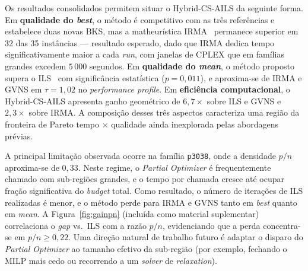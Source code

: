 Os resultados consolidados permitem situar o Hybrid-CS-AILS da seguinte
forma. Em \textbf{qualidade do \emph{best}}, o método é competitivo
com as três referências e estabelece duas novas BKS, mas a matheurística
IRMA~\cite{Stefanello2015} permanece superior em 32 das 35 instâncias
--- resultado esperado, dado que IRMA dedica tempo significativamente
maior a cada \emph{run}, com janelas de \textsc{CPLEX} que em famílias
grandes excedem $5\,000$ segundos. Em \textbf{qualidade do \emph{mean}},
o método proposto supera o ILS~\cite{Freitas2025} com significância
estatística ($p=0{,}011$), e aproxima-se de IRMA e GVNS em $\tau=1{,}02$
no \emph{performance profile}. Em \textbf{eficiência computacional}, o
Hybrid-CS-AILS apresenta ganho geométrico de $6{,}7\times$ sobre ILS e
GVNS e $2{,}3\times$ sobre IRMA. A composição desses três aspectos
caracteriza uma região da fronteira de Pareto
tempo $\times$ qualidade ainda inexplorada pelas abordagens prévias.

A principal limitação observada ocorre na família \texttt{p3038},
onde a densidade $p/n$ aproxima-se de $0{,}33$. Neste regime, o
\emph{Partial Optimizer} é frequentemente chamado com sub-regiões
grandes, e o tempo por chamada cresce até ocupar
fração significativa do \emph{budget} total. Como resultado, o número
de iterações de ILS realizadas é menor, e o método
perde para IRMA e GVNS tanto em \emph{best} quanto em \emph{mean}. A
Figura~\ref{fig:gainpn} (incluída como material suplementar) correlaciona
o \emph{gap} vs.\ ILS com a razão $p/n$, evidenciando que a perda
concentra-se em $p/n \geq 0{,}22$. Uma direção natural de trabalho
futuro é adaptar o disparo do \emph{Partial Optimizer} ao tamanho
efetivo da sub-região (por exemplo, fechando o MILP mais cedo ou
recorrendo a um \emph{solver} de \emph{relaxation}).

